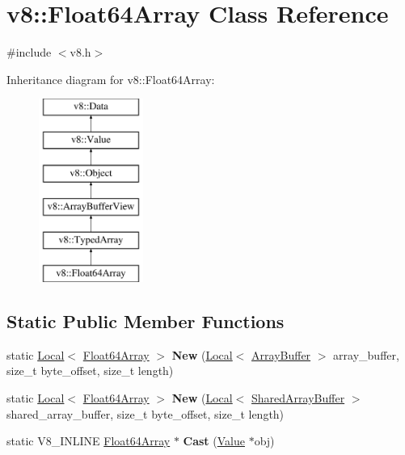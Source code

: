 \hypertarget{classv8_1_1Float64Array}{}\section{v8\+:\+:Float64\+Array Class Reference}
\label{classv8_1_1Float64Array}


{\ttfamily \#include $<$v8.\+h$>$}

Inheritance diagram for v8\+:\+:Float64\+Array\+:\begin{figure}[H]
\begin{center}
\leavevmode
\includegraphics[height=6.000000cm]{classv8_1_1Float64Array}
\end{center}
\end{figure}
\subsection*{Static Public Member Functions}
\begin{DoxyCompactItemize}
\item 
\mbox{\label{classv8_1_1Float64Array_a6e12e5ced578a357cfd049e036c4d6d6}} 
static \mbox{\hyperlink{classv8_1_1Local}{Local}}$<$ \mbox{\hyperlink{classv8_1_1Float64Array}{Float64\+Array}} $>$ {\bfseries New} (\mbox{\hyperlink{classv8_1_1Local}{Local}}$<$ \mbox{\hyperlink{classv8_1_1ArrayBuffer}{Array\+Buffer}} $>$ array\+\_\+buffer, size\+\_\+t byte\+\_\+offset, size\+\_\+t length)
\item 
\mbox{\label{classv8_1_1Float64Array_aff414a8613e468f7deb29996f049e130}} 
static \mbox{\hyperlink{classv8_1_1Local}{Local}}$<$ \mbox{\hyperlink{classv8_1_1Float64Array}{Float64\+Array}} $>$ {\bfseries New} (\mbox{\hyperlink{classv8_1_1Local}{Local}}$<$ \mbox{\hyperlink{classv8_1_1SharedArrayBuffer}{Shared\+Array\+Buffer}} $>$ shared\+\_\+array\+\_\+buffer, size\+\_\+t byte\+\_\+offset, size\+\_\+t length)
\item 
\mbox{\label{classv8_1_1Float64Array_a936ee8e8cb2cb892cc5369e3ee6a7784}} 
static V8\+\_\+\+I\+N\+L\+I\+NE \mbox{\hyperlink{classv8_1_1Float64Array}{Float64\+Array}} $\ast$ {\bfseries Cast} (\mbox{\hyperlink{classv8_1_1Value}{Value}} $\ast$obj)
\end{DoxyCompactItemize}
